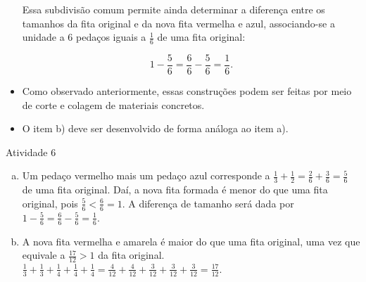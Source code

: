 \begin{multicols}{2}
\begin{itemize}
\begin{center}
\end{center}


Essa subdivisão comum permite ainda determinar a diferença entre os tamanhos da fita original e da nova fita vermelha e azul, associando-se a unidade a 6 pedaços iguais a $\frac{1}{6}$ de uma fita original:

$$ 1 - \dfrac{5}{6}=\dfrac{6}{6} - \dfrac{5}{6} = \dfrac{1}{6}.$$

\begin{center}
\end{center}
  \item Como observado anteriormente, essas construções podem ser feitas por meio de corte e colagem de materiais concretos.
  \item O item b) deve ser desenvolvido de forma análoga ao item a).
\end{itemize} %

\pagebreak

\begin{resposta*}{Atividade 6}
\begin{enumerate}[a)]
   \item Um pedaço vermelho mais um pedaço azul corresponde a $\frac{1}{3} + \frac{1}{2} = \frac{2}{6}+ \frac{3}{6} = \frac{5}{6}$ de uma fita original. Daí, a nova fita formada é menor do que uma fita original, pois $\frac{5}{6}<\frac{6}{6}=1$. A diferença de tamanho será dada por $1- \frac{5}{6} = \frac{6}{6} - \frac{5}{6} = \frac{1}{6}$.
   \item A nova fita vermelha e amarela é maior do que uma fita original, uma vez que equivale a $\frac{17}{12}>1$ da fita original.
$\frac{1}{3}+\frac{1}{3}+\frac{1}{4}+\frac{1}{4}+\frac{1}{4} = \frac{4}{12}+\frac{4}{12}+\frac{3}{12}+\frac{3}{12}+\frac{3}{12} = \frac{17}{12}$.
  \end{enumerate}
\end{resposta*}


\end{multicols}
